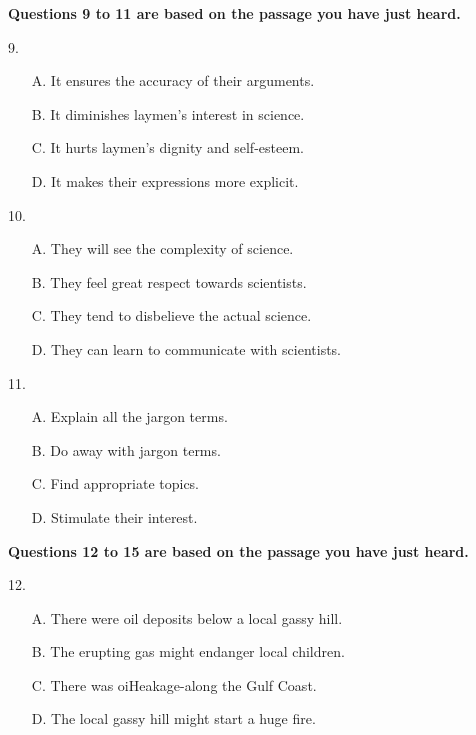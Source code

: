 \documentclass[UTF8,11pt]{ctexart}
\begin{document}
\textbf{Questions 9 to 11 are based on the passage you have just heard.}


9.


\begin{itemize}[leftmargin=2em,itemsep=.2em,topsep=.4em]\item[A.] It ensures the accuracy of their arguments.
\item[B.] It diminishes laymen's interest in science.
\item[C.] It hurts laymen's dignity and self-esteem.
\item[D.] It makes their expressions more explicit.
\end{itemize}

10.


\begin{itemize}[leftmargin=2em,itemsep=.2em,topsep=.4em]\item[A.] They will see the complexity of science.
\item[B.] They feel great respect towards scientists.
\item[C.] They tend to disbelieve the actual science.
\item[D.] They can learn to communicate with scientists.
\end{itemize}

11.


\begin{itemize}[leftmargin=2em,itemsep=.2em,topsep=.4em]\item[A.] Explain all the jargon terms.
\item[B.] Do away with jargon terms.
\item[C.] Find appropriate topics.
\item[D.] Stimulate their interest.
\end{itemize}

\textbf{Questions 12 to 15 are based on the passage you have just heard.}


12.


\begin{itemize}[leftmargin=2em,itemsep=.2em,topsep=.4em]\item[A.] There were oil deposits below a local gassy hill.
\item[B.] The erupting gas might endanger local children.
\item[C.] There was oiHeakage-along the Gulf Coast.
\item[D.] The local gassy hill might start a huge fire.
\end{itemize}
\end{document}
